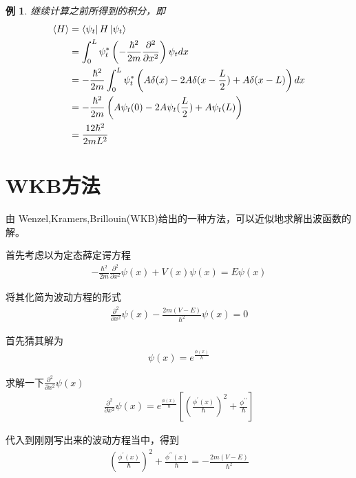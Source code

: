 \documentclass{article}
\newtheorem{example}{例}
\newcommand{\expectation}[1]{\langle #1 \rangle}
\begin{document}
\begin{example}
	继续计算之前所得到的积分，即
	\begin{align*}
		\expectation{H} & =\bra{\psi_t}H\ket{\psi_t}                                                                             \\
		                & =\int_{0}^{L}\psi^*_t\left(-\frac{\hbar^2}{2m}\frac{\partial^2}{\partial x^2}\right)\psi_tdx           \\
		                & =-\frac{\hbar^2}{2m}\int_{0}^{L}\psi^*_t\left(A\delta(x)-2A\delta(x-\frac{L}{2})+A\delta(x-L)\right)dx \\
		                & =-\frac{\hbar^2}{2m}\left(A\psi_t(0)-2A\psi_t(\frac{L}{2})+A\psi_t(L)\right)                           \\
		                & =\frac{12\hbar^2}{2mL^2}
	\end{align*}


\end{example}

\section{WKB方法}
由 Wenzel,Kramers,Brillouin(WKB)给出的一种方法，可以近似地求解出波函数的解。

首先考虑以为定态薛定谔方程
\begin{align*}
	-\frac{\hbar^2}{2m}\frac{\partial^2}{\partial x^2}\psi(x)+V(x)\psi(x)=E\psi(x)
\end{align*}

将其化简为波动方程的形式
\begin{align*}
	\frac{\partial^2}{\partial x^2}\psi(x)-\frac{2m(V-E)}{\hbar^2}\psi(x)=0
\end{align*}

首先猜其解为
\begin{align*}
	\psi(x)=e^{\frac{\phi(x)}{\hbar}}
\end{align*}

求解一下$\displaystyle\frac{\partial^2}{\partial x^2}\psi(x)$
\begin{align*}
	\displaystyle\frac{\partial^2}{\partial x^2}\psi(x)=e^{\frac{\phi(x)}{\hbar}}\left[\left(\frac{\phi^\prime(x)}{\hbar}\right)^2+\frac{\phi^{\prime\prime}}{\hbar}\right]
\end{align*}

代入到刚刚写出来的波动方程当中，得到
\begin{align*}
	\left(\frac{\phi^\prime(x)}{\hbar}\right)^2+\frac{\phi^{\prime\prime}(x)}{\hbar}=-\frac{2m(V-E)}{\hbar^2}
\end{align*}
\end{document}
